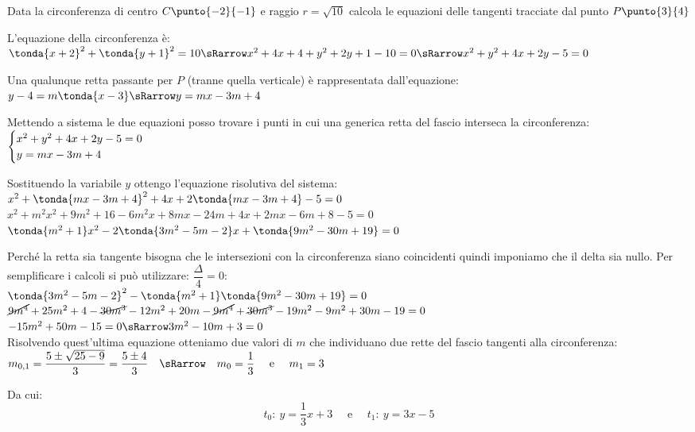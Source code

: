 \begin{esempio}
Data la circonferenza di centro \(C\punto{-2}{-1}\) e raggio \(r=\sqrt{10}\) 
calcola le equazioni delle tangenti tracciate dal punto \(P\punto{3}{4}\)

L'equazione della circonferenza è: \\
\(\tonda{x +2}^2 + \tonda{y+1}^2 = 10
\sRarrow x^2 +4x +4 +y^2 +2y +1 -10 = 0
\sRarrow x^2 +y^2 +4x +2y -5 = 0\)

Una qualunque retta passante per \(P\) (tranne quella verticale) è rappresentata dall'equazione: \\
\(y -4 = m \tonda{x -3} \sRarrow y = mx -3m +4\)

Mettendo a sistema le due equazioni posso trovare i punti in cui una generica 
retta del fascio interseca la circonferenza: \\
\(\begin{cases}x^2 +y^2 +4x +2y -5 = 0 \\ y = mx -3m +4\end{cases}\)

Sostituendo la variabile \(y\) ottengo l'equazione risolutiva del sistema: \\
\(x^2 +\tonda{mx -3m +4}^2 +4x +2\tonda{mx -3m +4} -5 = 0 \)\\
\(x^2 +m^2x^2 +9m^2 +16 -6m^2x +8mx -24m +4x +2mx -6m +8 -5 = 0 \)\\
\(\tonda{m^2 +1}x^2 - 2\tonda{3m^2 -5m -2}x +\tonda{9m^2 -30m +19} = 0 \)

Perché la retta sia tangente bisogna che le intersezioni con la circonferenza 
siano coincidenti quindi imponiamo che il delta sia nullo. Per semplificare i calcoli si può utilizzare: \(\dfrac{\Delta}{4} = 0\): \\
\(\tonda{3m^2 -5m -2}^2 - \tonda{m^2 +1} \tonda{9m^2 -30m +19} = 0 \) \\
\(\cancel{9m^4} +25m^2 +4 -\cancel{30m^3} -12m^2 + 20 m -
\cancel{9m^4} +\cancel{30m^3} -19m^2 -9m^2 +30m -19= 0 \) \\
\(-15m^2 +50 m -15= 0 \sRarrow 3m^2 -10m +3 = 0\) \\

Risolvendo quest'ultima equazione otteniamo due valori di \(m\) che individuano 
due rette del fascio tangenti alla circonferenza: \\
\(m_{0, 1} = \dfrac{5 \pm \sqrt{25-9}}{3} = \dfrac{5 \pm 4}{3} \quad \sRarrow
\quad m_0 = \dfrac{1}{3} \quad \text{ e } \quad m_1 = 3\)

Da cui: 
\[t_0:~y = \dfrac{1}{3}x +3 \quad \text{ e } \quad t_1:~y = 3x -5\]

\end{esempio}

